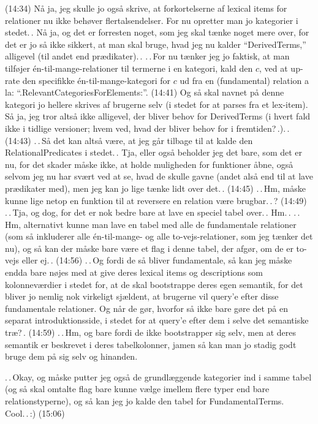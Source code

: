\documentclass{report}
\begin{document}
(14:34) Nå ja, jeg skulle jo også skrive, at forkortelserne af lexical items for relationer nu ikke behøver flertalsendelser. For nu opretter man jo kategorier i stedet.\,. Nå ja, og det er forresten noget, som jeg skal tænke noget mere over, for det er jo så ikke sikkert, at man skal bruge, hvad jeg nu kalder ``DerivedTerms,'' alligevel (til andet end prædikater).\,. .\,.\,For nu tænker jeg jo faktisk, at man tilføjer én-til-mange-relationer til termerne i en kategori, kald den $c$, ved at up-rate den specifikke én-til-mange-kategori for $c$ ud fra en (fundamental) relation a la: ``.RelevantCategoriesForElements:''. (14:41) Og så skal navnet på denne kategori jo hellere skrives af brugerne selv (i stedet for at parses fra et lex-item). Så ja, jeg tror altså ikke alligevel, der bliver behov for DerivedTerms (i hvert fald ikke i tidlige versioner; hvem ved, hvad der bliver behov for i fremtiden?\,.).\,. (14:43) .\,.\,Så det kan altså være, at jeg går tilbage til at kalde den RelationalPredicates i stedet.\,. Tja, eller også beholder jeg det bare, som det er nu, for det skader måske ikke, at holde muligheden for funktioner åbne, også selvom jeg nu har svært ved at se, hvad de skulle gavne (andet alså end til at lave prædikater med), men jeg kan jo lige tænke lidt over det.\,. (14:45) .\,.\,Hm, måske kunne lige netop en funktion til at reversere en relation være brugbar.\,.\,? (14:49) .\,.\,Tja, og dog, for det er nok bedre bare at lave en speciel tabel over.\,. Hm.\,. .\,.\,Hm, alternativt kunne man lave en tabel med alle de fundamentale relationer (som så inkluderer alle én-til-mange- og alle to-vejs-relationer, som jeg tænker det nu), og så kan der måske bare være et flag i denne tabel, der afgør, om de er to-vejs eller ej.\,. (14:56) .\,.\,Og fordi de så bliver fundamentale, så kan jeg måske endda bare nøjes med at give deres lexical items og descriptions som kolonneværdier i stedet for, at de skal bootstrappe deres egen semantik, for det bliver jo nemlig nok virkeligt sjældent, at brugerne vil query'e efter disse fundamentale relationer. Og når de gør, hvorfor så ikke bare gøre det på en separat introduktionsside, i stedet for at query'e efter dem i selve det semantiske træ?\,. (14:59) .\,.\,Hm, og bare fordi de ikke bootstrapper sig selv, men at deres semantik er beskrevet i deres tabelkolonner, jamen så kan man jo stadig godt bruge dem på sig selv og hinanden. 

.\,.\,Okay, og måske putter jeg også de grundlæggende kategorier ind i samme tabel (og så skal omtalte flag bare kunne vælge imellem flere typer end bare relationstyperne), og så kan jeg jo kalde den tabel for FundamentalTerms. Cool.\,.\,:) (15:06)
\end{document}
